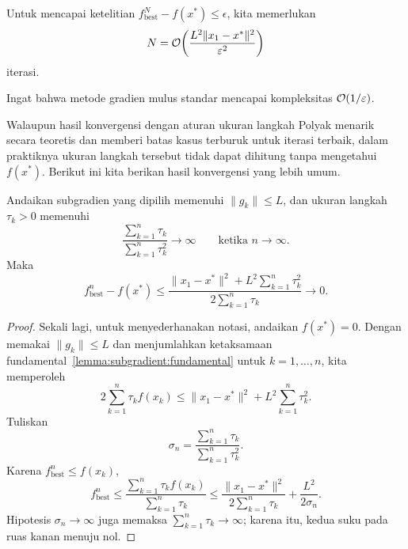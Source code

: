 \begin{cor}
    Untuk mencapai ketelitian \(f_{\mathrm{best}}^N - f(x^*)\leq \epsilon\), kita memerlukan
    \[
        N=\mathcal{O}\!\left(\frac{L^2\|x_1-x^*\|^2}{\varepsilon^2}\right)
    \]
    iterasi.
\end{cor}

\begin{rem}
    Ingat bahwa metode gradien mulus standar mencapai kompleksitas \(\mathcal{O}(1/\varepsilon)\).
\end{rem}

Walaupun hasil konvergensi dengan aturan ukuran langkah Polyak menarik secara teoretis dan memberi batas kasus terburuk untuk iterasi terbaik, dalam praktiknya ukuran langkah tersebut tidak dapat dihitung tanpa mengetahui \(f(x^*)\). Berikut ini kita berikan hasil konvergensi yang lebih umum.

\begin{theorem}
    Andaikan subgradien yang dipilih memenuhi \(\|g_k\|\leq L\), dan ukuran langkah \(\tau_k>0\) memenuhi
    \[
        \frac{\sum_{k=1}^n\tau_k}{\sum_{k=1}^n\tau_k^2}\rightarrow \infty
        \qquad\text{ketika }n\rightarrow\infty.
    \]
    Maka
    \[
        f^n_{\mathrm{best}}-f(x^*)
        \leq
        \frac{\|x_1-x^*\|^2+L^2\sum_{k=1}^n\tau_k^2}
             {2\sum_{k=1}^n\tau_k}
        \longrightarrow0.
    \]
\end{theorem}
\begin{proof}
    Sekali lagi, untuk menyederhanakan notasi, andaikan \(f(x^*)=0\). Dengan memakai \(\|g_k\|\leq L\) dan menjumlahkan ketaksamaan fundamental~\cref{lemma:subgradient:fundamental} untuk \(k=1,\dots,n\), kita memperoleh
    \begin{equation}
        2\sum_{k=1}^n\tau_k f(x_k)
        \leq \|x_1-x^*\|^2 + L^2 \sum_{k=1}^n \tau_k^2.
    \end{equation}
    Tuliskan
    \[
        \sigma_n = \frac{\sum_{k=1}^n\tau_k}{\sum_{k=1}^n\tau_k^2}.
    \]
    Karena \(f^n_{\mathrm{best}}\leq f(x_k)\),
    \begin{equation}
        f^n_{\mathrm{best}}
        \leq \frac{\sum_{k=1}^n\tau_kf(x_k)}{\sum_{k=1}^n\tau_k}
        \leq \frac{\|x_1-x^*\|^2}{2\sum_{k=1}^n\tau_k}
        +\frac{L^2}{2\sigma_n}.
    \end{equation}
    Hipotesis \(\sigma_n\rightarrow\infty\) juga memaksa \(\sum_{k=1}^n\tau_k\rightarrow\infty\); karena itu, kedua suku pada ruas kanan menuju nol.
\end{proof}


